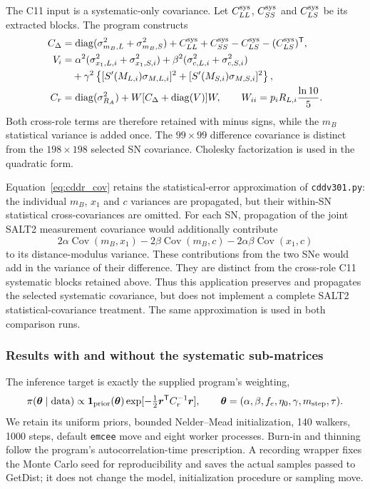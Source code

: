 The C11 input is a systematic-only covariance. Let $C_{LL}^{\rm sys}$, $C_{SS}^{\rm sys}$ and $C_{LS}^{\rm sys}$ be its extracted blocks. The program constructs
\begin{align}
 C_\Delta&=\operatorname{diag}(\sigma_{m_B,L}^2+\sigma_{m_B,S}^2)
 +C_{LL}^{\rm sys}+C_{SS}^{\rm sys}-C_{LS}^{\rm sys}-(C_{LS}^{\rm sys})^{\mathsf T},\\
 V_i&=\alpha^2(\sigma_{x_1,L,i}^2+\sigma_{x_1,S,i}^2)
 +\beta^2(\sigma_{c,L,i}^2+\sigma_{c,S,i}^2)\nonumber\\
 &\quad+\gamma^2\left\{[S'(M_{L,i})\sigma_{M,L,i}]^2+[S'(M_{S,i})\sigma_{M,S,i}]^2\right\},\\
 C_r&=\operatorname{diag}(\sigma_{R_A}^2)+W[C_\Delta+\operatorname{diag}(V)]W,
 \qquad W_{ii}=p_iR_{L,i}\frac{\ln10}{5}.
 \label{eq:cddr_cov}
\end{align}
Both cross-role terms are therefore retained with minus signs, while the $m_B$ statistical variance is added once. The $99\times99$ difference covariance is distinct from the $198\times198$ selected SN covariance. Cholesky factorization is used in the quadratic form.

Equation~\ref{eq:cddr_cov} retains the statistical-error approximation of \texttt{cddv301.py}: the individual $m_B$, $x_1$ and $c$ variances are propagated, but their within-SN statistical cross-covariances are omitted. For each SN, propagation of the joint SALT2 measurement covariance would additionally contribute
\begin{equation}
 2\alpha\operatorname{Cov}(m_B,x_1)
 -2\beta\operatorname{Cov}(m_B,c)
 -2\alpha\beta\operatorname{Cov}(x_1,c)
 \label{eq:cddr_stat_omitted}
\end{equation}
to its distance-modulus variance. These contributions from the two SNe would add in the variance of their difference. They are distinct from the cross-role C11 systematic blocks retained above. Thus this application preserves and propagates the selected systematic covariance, but does not implement a complete SALT2 statistical-covariance treatment. The same approximation is used in both comparison runs.

\subsubsection{Results with and without the systematic sub-matrices}
The inference target is exactly the supplied program's weighting,
\begin{equation}
 \pi(\boldsymbol\theta\mid\mathrm{data})\propto
 \mathbf{1}_{\rm prior}(\boldsymbol\theta)
 \exp[-\tfrac12\boldsymbol r^{\mathsf T}C_r^{-1}\boldsymbol r],\qquad
 \boldsymbol\theta=(\alpha,\beta,f_e,\eta_0,\gamma,m_{\rm step},\tau).
 \label{eq:cddr_kernel}
\end{equation}
We retain its uniform priors, bounded Nelder--Mead initialization, 140 walkers, 1000 steps, default \texttt{emcee} move and eight worker processes. Burn-in and thinning follow the program's autocorrelation-time prescription. A recording wrapper fixes the Monte Carlo seed for reproducibility and saves the actual samples passed to GetDist; it does not change the model, initialization procedure or sampling move.

